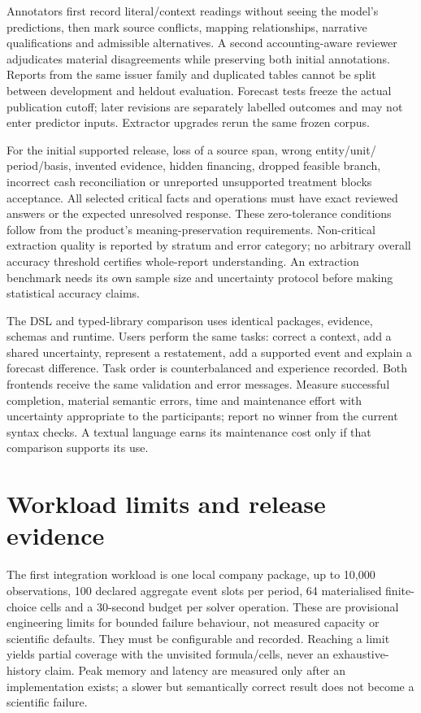 Annotators first record literal/context readings without seeing the model's
predictions, then mark source conflicts, mapping relationships, narrative
qualifications and admissible alternatives. A second accounting-aware reviewer
adjudicates material disagreements while preserving both initial annotations.
Reports from the same issuer family and duplicated tables cannot be split
between development and heldout evaluation. Forecast tests freeze the actual
publication cutoff; later revisions are separately labelled outcomes and may
not enter predictor inputs. Extractor upgrades rerun the same frozen corpus.

For the initial supported release, loss of a source span, wrong entity/unit/
period/basis, invented evidence, hidden financing, dropped feasible branch,
incorrect cash reconciliation or unreported unsupported treatment blocks
acceptance. All selected critical facts and operations must have exact
reviewed answers or the expected unresolved response. These zero-tolerance
conditions follow from the product's meaning-preservation requirements.
Non-critical extraction quality is reported by stratum and error category;
no arbitrary overall accuracy threshold certifies whole-report understanding.
An extraction benchmark needs its own sample size and uncertainty protocol
before making statistical accuracy claims.

The DSL and typed-library comparison uses identical packages, evidence,
schemas and runtime. Users perform the same tasks: correct a context, add a
shared uncertainty, represent a restatement, add a supported event and explain
a forecast difference. Task order is counterbalanced and experience recorded.
Both frontends receive the same validation and error messages. Measure
successful completion, material semantic errors, time and maintenance effort
with uncertainty appropriate to the participants; report no winner from the
current syntax checks. A textual language earns its maintenance cost only if
that comparison supports its use.

\section{Workload limits and release evidence}

The first integration workload is one local company package, up to 10,000
observations, 100 declared aggregate event slots per period, 64 materialised
finite-choice cells and a 30-second budget per solver operation. These are
provisional engineering limits for bounded failure behaviour, not measured
capacity or scientific defaults. They must be configurable and recorded.
Reaching a limit yields partial coverage with the unvisited formula/cells,
never an exhaustive-history claim. Peak memory and latency are measured only
after an implementation exists; a slower but semantically correct result
does not become a scientific failure.

